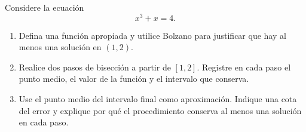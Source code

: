 \documentclass[10pt,a4paper]{article}
\newif\ifmostrarSoluciones
\newenvironment{solucionejercicio}[1]{%
  \par\medskip\noindent\textbf{Solución del ejercicio #1.}%
  \enspace\ignorespaces
}{%
  \par\medskip
}
\begin{document}
\ifmostrarSoluciones
\begin{solucionejercicio}{2}
  \begin{enumerate}
    \item El denominador es positivo para todo $x$, así que $g$ es continua en $[-2,1]$. El intervalo es cerrado y acotado; máximo--mínimo garantiza ambos extremos. Para $x\in[-2,1]$,
    \[
      0\leq x^2\leq4,\qquad 1\leq1+x^2\leq5,
    \]
    de donde
    \[
      \frac15\leq g(x)\leq1.
    \]
    El mínimo es $1/5$, alcanzado solamente en $x=-2$; el máximo es $1$, alcanzado solamente en $x=0$.
    \item Por continuidad y valor intermedio, se alcanzan todos los valores entre los extremos absolutos. En consecuencia, $g(I)=[1/5,1]$. No coincide con el intervalo $[g(-2),g(1)]=[1/5,1/2]$: los valores en los extremos del dominio no tienen por qué ser los extremos de la imagen.
    \item En $J$ se cumple $1/5<g(x)\leq1$. El valor $1$ se alcanza en $0$; el valor $1/5$ no se alcanza porque $x=-2$ no está incluido y $x=2$ tampoco pertenece a $J$. Para cualquier $y\in(1/5,1]$, el punto
    \[
      x=-\sqrt{1/y-1}
    \]
    pertenece a $(-2,0]$ y satisface $g(x)=y$. Por tanto, $g(J)=(1/5,1]$. Hay máximo, pero no mínimo; la imagen es un intervalo semiabierto, aunque el intervalo de partida sea abierto.
  \end{enumerate}
\end{solucionejercicio}
\fi

\begin{ejerciciopractica}
  Considere la ecuación
  \[
    x^3+x=4.
  \]
  \begin{enumerate}
    \item Defina una función apropiada y utilice Bolzano para justificar que hay al menos una solución en $(1,2)$.
    \item Realice dos pasos de bisección a partir de $[1,2]$. Registre en cada paso el punto medio, el valor de la función y el intervalo que conserva.
    \item Use el punto medio del intervalo final como aproximación. Indique una cota del error y explique por qué el procedimiento conserva al menos una solución en cada paso.
  \end{enumerate}
\end{ejerciciopractica}
\end{document}
